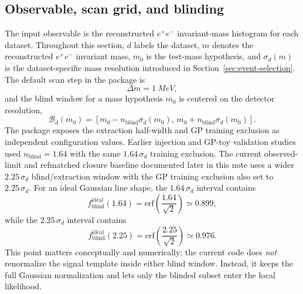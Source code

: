 \subsection{Observable, scan grid, and blinding}

The input observable is the reconstructed $e^+e^-$ invariant-mass histogram for each
dataset. Throughout this section, $d$ labels the dataset, $m$ denotes the reconstructed
$e^+e^-$ invariant mass, $m_0$ is the test-mass hypothesis, and $\sigma_d(m)$ is the
dataset-specific mass resolution introduced in
Section~\ref{sec:event-selection}. The default scan step in the package is
\begin{equation}
\Delta m = \SI{1}{MeV},
\end{equation}
and the blind window for a mass hypothesis $m_0$ is centered on the detector
resolution,
\begin{equation}
\mathcal{B}_d(m_0) =
\left[m_0 - n_{\mathrm{blind}}\sigma_d(m_0),\,
      m_0 + n_{\mathrm{blind}}\sigma_d(m_0)\right].
\end{equation}
The package exposes the extraction half-width and GP training exclusion as independent
configuration values. Earlier injection and GP-toy validation studies used
$n_{\mathrm{blind}}=1.64$ with the same $1.64\,\sigma_d$ training exclusion. The current
observed-limit and refmatched closure baseline documented later in this note uses a
wider $2.25\,\sigma_d$ blind/extraction window with the GP training exclusion also set
to $2.25\,\sigma_d$. For an ideal Gaussian line shape, the $1.64\,\sigma_d$ interval
contains
\begin{equation}
f_{\mathrm{blind}}^{\mathrm{ideal}}(1.64)
= \mathrm{erf}\!\left(\frac{1.64}{\sqrt{2}}\right)
\simeq 0.899,
\end{equation}
while the $2.25\,\sigma_d$ interval contains
\begin{equation}
f_{\mathrm{blind}}^{\mathrm{ideal}}(2.25)
= \mathrm{erf}\!\left(\frac{2.25}{\sqrt{2}}\right)
\simeq 0.976.
\end{equation}
This point matters conceptually and numerically: the current code does
\emph{not} renormalize the signal template inside either blind window. Instead, it
keeps the full Gaussian normalization and lets only the blinded subset enter the local
likelihood.

